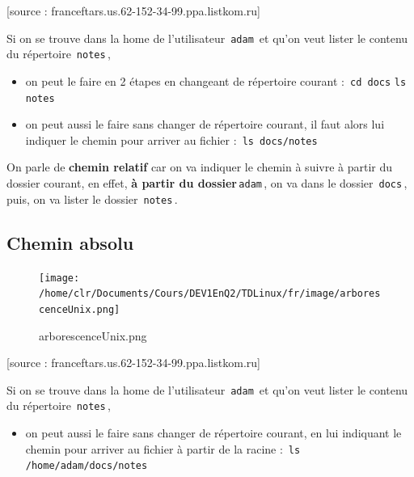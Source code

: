 \documentclass[11pt,a4paper]{article}
\begin{document}
			    
			    [source : franceftars.us.62-152-34-99.ppa.listkom.ru]
        
            \par
        
        Si on se trouve dans la home de l'utilisateur \,\verb|adam|\, et qu'on veut lister le contenu du r\'epertoire \,\verb|notes|\,,
        
					\begin{itemize}
				
			\item 
            on peut le faire en 2 \'etapes en changeant de r\'epertoire courant :
            \,\verb|cd docs|\,\,\verb|ls notes|\,
			\item 
            on peut aussi le faire sans changer de r\'epertoire courant, 
            il faut alors lui indiquer le chemin pour arriver au fichier :
            \,\verb|ls docs/notes|\,
					\end{itemize}
				
        On parle de  \textbf{chemin relatif} car on va indiquer le chemin \`a suivre \`a partir du dossier courant,
        en effet, \textbf{\`a partir du dossier}\,\verb|adam|\,,
        on va dans le dossier \,\verb|docs|\,, puis, on va lister le dossier \,\verb|notes|\,.
        
            \par
        \subsection{Chemin absolu}\begin{figure}[hbt]
				    \begin{center}
					\texttt{[image: /home/clr/Documents/Cours/DEV1EnQ2/TDLinux/fr/image/arborescenceUnix.png]}
						\end{center}
                
                    \caption[arborescenceUnix.png]{arborescenceUnix.png}
                \end{figure}
                    
			    
			    [source : franceftars.us.62-152-34-99.ppa.listkom.ru]
        
            \par
        
        Si on se trouve dans la home de l'utilisateur \,\verb|adam|\, et qu'on veut lister le contenu du r\'epertoire \,\verb|notes|\,,
        
					\begin{itemize}
				
			\item 
            on peut aussi le faire sans changer de r\'epertoire courant, 
            en lui indiquant le chemin pour arriver au fichier \`a partir de la racine :
            \,\verb|ls /home/adam/docs/notes|\,
					\end{itemize}
				
\end{document}
